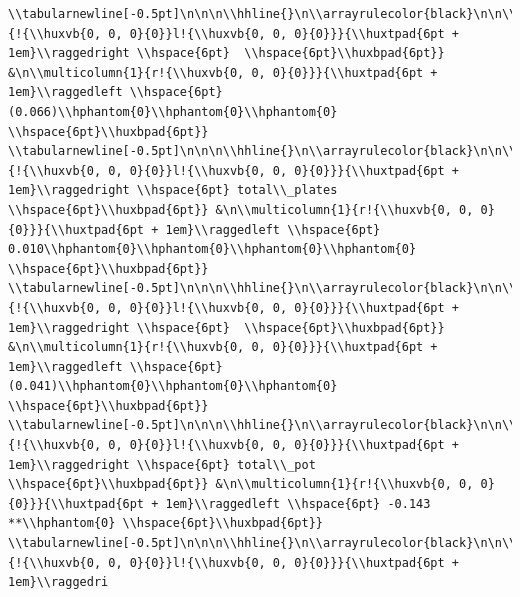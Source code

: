 \documentclass[11pt,preprint, authoryear]{elsarticle}
\numberwithin{equation}{section}
\numberwithin{figure}{section}
\numberwithin{table}{section}
\begin{document}
\begin{verbatim}
\\tabularnewline[-0.5pt]\n\n\n\\hhline{}\n\\arrayrulecolor{black}\n\n\\multicolumn{1}{!{\\huxvb{0, 0, 0}{0}}l!{\\huxvb{0, 0, 0}{0}}}{\\huxtpad{6pt + 1em}\\raggedright \\hspace{6pt}  \\hspace{6pt}\\huxbpad{6pt}} &\n\\multicolumn{1}{r!{\\huxvb{0, 0, 0}{0}}}{\\huxtpad{6pt + 1em}\\raggedleft \\hspace{6pt} (0.066)\\hphantom{0}\\hphantom{0}\\hphantom{0} \\hspace{6pt}\\huxbpad{6pt}} \\tabularnewline[-0.5pt]\n\n\n\\hhline{}\n\\arrayrulecolor{black}\n\n\\multicolumn{1}{!{\\huxvb{0, 0, 0}{0}}l!{\\huxvb{0, 0, 0}{0}}}{\\huxtpad{6pt + 1em}\\raggedright \\hspace{6pt} total\\_plates \\hspace{6pt}\\huxbpad{6pt}} &\n\\multicolumn{1}{r!{\\huxvb{0, 0, 0}{0}}}{\\huxtpad{6pt + 1em}\\raggedleft \\hspace{6pt} 0.010\\hphantom{0}\\hphantom{0}\\hphantom{0}\\hphantom{0} \\hspace{6pt}\\huxbpad{6pt}} \\tabularnewline[-0.5pt]\n\n\n\\hhline{}\n\\arrayrulecolor{black}\n\n\\multicolumn{1}{!{\\huxvb{0, 0, 0}{0}}l!{\\huxvb{0, 0, 0}{0}}}{\\huxtpad{6pt + 1em}\\raggedright \\hspace{6pt}  \\hspace{6pt}\\huxbpad{6pt}} &\n\\multicolumn{1}{r!{\\huxvb{0, 0, 0}{0}}}{\\huxtpad{6pt + 1em}\\raggedleft \\hspace{6pt} (0.041)\\hphantom{0}\\hphantom{0}\\hphantom{0} \\hspace{6pt}\\huxbpad{6pt}} \\tabularnewline[-0.5pt]\n\n\n\\hhline{}\n\\arrayrulecolor{black}\n\n\\multicolumn{1}{!{\\huxvb{0, 0, 0}{0}}l!{\\huxvb{0, 0, 0}{0}}}{\\huxtpad{6pt + 1em}\\raggedright \\hspace{6pt} total\\_pot \\hspace{6pt}\\huxbpad{6pt}} &\n\\multicolumn{1}{r!{\\huxvb{0, 0, 0}{0}}}{\\huxtpad{6pt + 1em}\\raggedleft \\hspace{6pt} -0.143 **\\hphantom{0} \\hspace{6pt}\\huxbpad{6pt}} \\tabularnewline[-0.5pt]\n\n\n\\hhline{}\n\\arrayrulecolor{black}\n\n\\multicolumn{1}{!{\\huxvb{0, 0, 0}{0}}l!{\\huxvb{0, 0, 0}{0}}}{\\huxtpad{6pt + 1em}\\raggedri
\end{verbatim}
\end{document}
